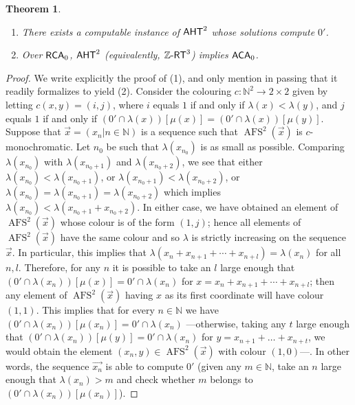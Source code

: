 \documentclass[11pt]{amsart}
\newcommand{\zrt}{\mathnormal{\mathbb Z\text{-}\mathsf{RT}}}
\newcommand{\aht}{\mathnormal{\mathsf{AHT}}}
\newcommand{\rca}{\mathnormal{\mathsf{RCA}}_0}
\newcommand{\aca}{\mathnormal{\mathsf{ACA}}_0}
\DeclareMathOperator{\afs}{AFS}
\newtheorem{theorem}{Theorem}%
\theoremstyle{definition}
\begin{document}
\begin{theorem}\label{lower-bound}\hfill
\begin{enumerate}
\item There exists a computable instance of $\aht^2$ whose solutions compute $0'$.
\item Over $\rca$, $\aht^2$ (equivalently, $\zrt^3$) implies $\aca$.
\end{enumerate}
\end{theorem}

\begin{proof}
We write explicitly the proof of (1), and only mention in passing that it readily formalizes to yield (2). Consider the colouring $c:\mathbb N^2\longrightarrow 2\times 2$ given by letting $c(x,y)=(i,j)$, where $i$ equals $1$ if and only if $\lambda(x)<\lambda(y)$, and $j$ equals $1$ if and only if $(0'\cap\lambda(x))[\mu(x)]=(0'\cap\lambda(x))[\mu(y)]$. Suppose that $\vec{x}=(x_n\big|n\in\mathbb N)$ is a sequence such that $\afs^2(\vec{x})$ is $c$-monochromatic. Let $n_0$ be such that $\lambda(x_{n_0})$ is as small as possible. Comparing $\lambda(x_{n_0})$ with $\lambda(x_{n_0+1})$ and $\lambda(x_{n_0+2})$, we see that either $\lambda(x_{n_0})<\lambda(x_{n_0+1})$, or $\lambda(x_{n_0+1})<\lambda(x_{n_0+2})$, or $\lambda(x_{n_0})=\lambda(x_{n_0+1})=\lambda(x_{n_0+2})$ which implies $\lambda(x_{n_0})<\lambda(x_{n_0+1}+x_{n_0+2})$. In either case, we have obtained an element of $\afs^2(\vec{x})$ whose colour is of the form $(1,j)$; hence all elements of $\afs^2(\vec{x})$ have the same colour and so $\lambda$ is strictly increasing on the sequence $\vec{x}$. In particular, this implies that $\lambda(x_n+x_{n+1}+\cdots+x_{n+l})=\lambda(x_n)$ for all $n,l$. Therefore, for any $n$ it is possible to take an $l$ large enough that $(0'\cap\lambda(x_n))[\mu(x)]=0'\cap\lambda(x_n)$ for $x=x_n+x_{n+1}+\cdots+x_{n+l}$; then any element of $\afs^2(\vec{x})$ having $x$ as its first coordinate will have colour $(1,1)$. This implies that for every $n\in\mathbb N$ we have $(0'\cap\lambda(x_n))[\mu(x_n)]=0'\cap\lambda(x_n)$ ---otherwise, taking any $t$ large enough that $(0'\cap\lambda(x_n))[\mu(y)]=0'\cap\lambda(x_n)$ for $y=x_{n+1}+\ldots+x_{n+t}$, we would obtain the element $(x_n,y)\in\afs^2(\vec{x})$ with colour $(1,0)$---. In other words, the sequence $\vec{x_n}$ is able to compute $0'$ (given any $m\in\mathbb N$, take an $n$ large enough that $\lambda(x_n)>m$ and check whether $m$ belongs to $(0'\cap\lambda(x_n))[\mu(x_n)]$).
\end{proof}
\end{document}

